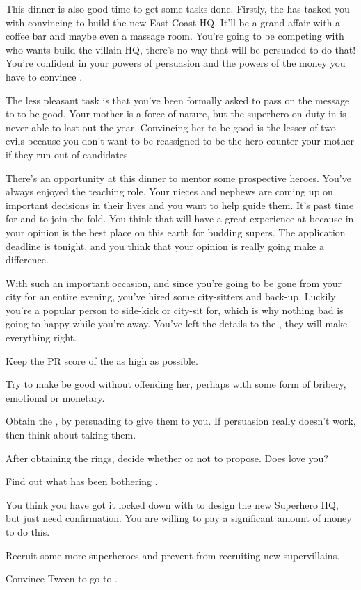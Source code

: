 \documentclass[char]{LRSguildcamp1}
\begin{document}
This dinner is also good time to get some tasks done. Firstly, the \cHeroLeague{} has tasked you with convincing \cArchitect{} to build the new East Coast HQ. It'll be a grand affair with a coffee bar and maybe even a massage room. You're going to be competing with \cOldest{} who wants \cArchitect{} build the villain HQ, there's no way that \cArchitect{} will be persuaded to do that! You're confident in your powers of persuasion and the powers of the money you have to convince \cArchitect{}. 

The less pleasant task is that you've been formally asked to pass on the message to \cGrandma{\parent} to be good. Your mother is a force of nature, but the superhero on duty in \pCityGrandma{} is never able to last out the year. Convincing her to be good is the lesser of two evils because you don't want to be reassigned to be the hero counter your mother if they run out of candidates. 

There's an opportunity at this dinner to mentor some prospective heroes. You've always enjoyed the teaching role. Your nieces and nephews are coming up on important decisions in their lives and you want to help guide them. It's past time for \cGrad{} and \cTeen{} to join the fold. You think that \cTween{} will have a great experience at \pSuperSchool{} because in your opinion \pSuperSchool{} is the best place on this earth for budding supers. The application deadline is tonight, and you think that your opinion is really going make a difference. 

With such an important occasion, and since you're going to be gone from your city for an entire evening, you've hired some city-sitters and back-up. Luckily you're a popular person to side-kick or city-sit for, which is why nothing bad is going to happy while you're away. You've left the details to the \cHeroLeague{}, they will make everything right. 

\begin{itemz}[Goals]
	\item Keep the PR score of the \cHeroLeague{} as high as possible.
	\item Try to make \cGrandma{} be good without offending her, perhaps with some form of bribery, emotional or monetary. 
	\item Obtain the \iEngagementRings{}, by persuading \cGrandma{} to give them to you. If persuasion really doesn't work, then think about taking them. 
	\item After obtaining the rings, decide whether or not to propose. Does \cYS{} love you?  
	\item Find out what has been bothering \cYS{}. 
	\item You think you have got it locked down with \cArchitect{} to design the new Superhero HQ, but just need confirmation. You are willing to pay a significant amount of money to do this.  
	\item  Recruit some more superheroes and prevent \cOldest{} from recruiting new supervillains.
	\item Convince Tween to go to \pSuperSchool{}. 
	
\end{itemz}
\end{document}
